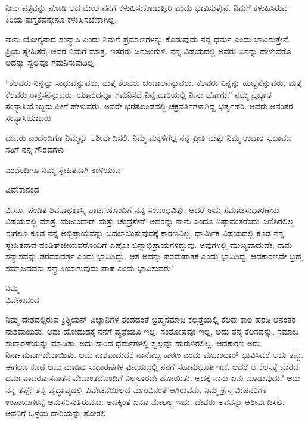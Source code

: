 ನೀವು ಪತ್ರವನ್ನು ನೋಡಿ ಆದ ಮೇಲೆ ನನಗೆ ಕಳುಹಿಸುಕೊಡುತ್ತೀರಿ ಎಂದು ಭಾವಿಸುತ್ತೇನೆ. ನಿಮಗೆ ಕಳುಹಿಸಿರುವ ಕಿರಿಯ ಪುಸ್ತಕವನ್ನೇನೂ ಕಳುಹಿಸಬೇಕಾಗಿಲ್ಲ.

ನಾನು ಯೋಗ್ಯನಾದ ಸಂನ್ಯಾಸಿ ಎಂದು ನಿಮಗೆ ಪ್ರಮಾಣಗಳನ್ನು ಕೊಡುವುದು ನನ್ನ ಧರ್ಮ ಎಂದು ಭಾವಿಸುತ್ತೇನೆ. ಪ್ರಿಯ ಸ್ನೇಹಿತರೆ, ಆದರೆ ನಿಮಗೆ ಮಾತ್ರ. ಇತರರು ಜನಜಂಗುಳಿ. ನನ್ನ ವಿಷಯದಲ್ಲಿ ಅವರು ಏನನ್ನು ಹೇಳುವರೊ ಅದನ್ನು ಸ್ವಲ್ಪವೂ ಗಮನಿಸುವುದಿಲ್ಲ.

“ಕೆಲವರು ನಿನ್ನನ್ನು ಸಾಧುವೆನ್ನುವರು, ಮತ್ತೆ ಕೆಲವರು ಚಂಡಾಲನೆನ್ನುವರು. ಕೆಲವರು ನಿನ್ನನ್ನು ಹುಚ್ಚನೆನ್ನುವರು, ಮತ್ತೆ ಕೆಲವರು ರಾಕ್ಷಸನೆನ್ನುವರು. ಯಾವುದನ್ನೂ ಗಮನಿಸದೆ ನಿನ್ನ ದಾರಿಯಲ್ಲಿ ನೀನು ಹೋಗು.” ನಮ್ಮ ಪ್ರಖ್ಯಾತ ಸಂನ್ಯಾಸಿಯೊಬ್ಬರು ಹೀಗೆ ಹೇಳುವರು. ಅವರೇ ಭರತಖಂಡದಲ್ಲಿ ಚಕ್ರವರ್ತಿಗಳಾಗಿದ್ದ ಭರ್ತೃಹರಿ. ಅವರು ಅನಂತರ ಸಂನ್ಯಾಸಿಯಾದರು.

ದೇವರು ಎಂದೆಂದಿಗೂ ನಿಮ್ಮನ್ನು ಆಶೀರ್ವದಿಸಲಿ. ನಿಮ್ಮ ಮಕ್ಕಳಿಗೆಲ್ಲ ನನ್ನ ಪ್ರೀತಿ ಮತ್ತು ನಿಮ್ಮ ಉದಾರ ಸ್ವಭಾವದ ಸತಿಗೆ ನನ್ನ ಗೌರವಗಳು

ಎಂದೆಂದಿಗೂ ನಿಮ್ಮ ಸ್ನೇಹಿತನಾಗಿ ಉಳಿಯುವ

\begin{flushright}
ವಿವೇಕಾನಂದ
\end{flushright}

ವಿ.ಸೂ. \enginline{-}ಪಂಡಿತ ಶಿವನಾಥಶಾಸ್ತ್ರಿ ಪಾರ್ಟಿಯೊಂದಿಗೆ ನನ್ನ ಸಂಬಂಧವಿತ್ತು. ಆದರೆ ಅದು ಸಮಾಜಸುಧಾರಣೆಯ ವಿಷಯದಲ್ಲಿ ಮಾತ್ರ. ಮಜುಂದಾರ್‌ ಮತ್ತು ಚಂದ್ರಸೇನ್ ಅವರನ್ನು ನಾನು ಎಂದೂ ನಿಷ್ಠಾವಂತರೆಂದು ಎಣಿಸಿರಲಿಲ್ಲ. ಈಗಲೂ ಕೂಡ ನನ್ನ ಅಭಿಪ್ರಾಯವನ್ನು ಬದಲಾಯಿಸುವುದಕ್ಕೆ ಕಾರಣವಿಲ್ಲ. ಧಾರ್ಮಿಕ ವಿಷಯದಲ್ಲಿ ಕೂಡ ನನ್ನ ಸ್ನೇಹಿತನಾದ ಪಂಡಿತ್‌ಜೀಯವರೊಂದಿಗೆ ಎಷ್ಟೋ ಭಿನ್ನಾಭಿಪ್ರಾಯಗಳಿದ್ದುವು. ಅವುಗಳಲ್ಲಿ ಮುಖ್ಯವಾದುದೇ, ನಾನು ಸನ್ಯಾಸವನ್ನು ಪರಮಾದರ್ಶ ಎಂದು ಭಾವಿಸಿದ್ದು. ಆತ ಅದನ್ನು ಪರಮಪಾತಕ ಎಂದು ಭಾವಿಸಿದ್ದ. ಆದಕಾರಣವೇ ಬ್ರಹ್ಮ ಸಮಾಜದವರು ಸನ್ಯಾಸಿಯಾಗುವುದು ಪಾಪ ಎಂದು ಭಾವಿಸುವರು!

\vspace{-0.3cm}

{\flushright
ನಿಮ್ಮ\\ವಿವೇಕಾನಂದ\par}

\vspace{0.2cm}

ನಿಮ್ಮ ದೇಶದಲ್ಲಿರುವ ಕ್ರಿಶ್ಚಿಯನ್ ವಿಜ್ಞಾನಿಗಳ ತಂಡದಂತೆ ಬ್ರಹ್ಮಸಮಾಜ ಕಲ್ಕತ್ತೆಯಲ್ಲಿ ಕೆಲವು ಕಾಲ ಹರಡಿ ಅನಂತರ ನಾಶವಾಯಿತು. ಅದು ಹೋದುದಕ್ಕೆ ನನಗೆ ವ್ಯಥೆಯೂ ಇಲ್ಲ, ಸಂತೋಷವೂ ಇಲ್ಲ. ಅದು ತನ್ನ ಕೆಲಸವನ್ನು, ಸಮಾಜ ಸುಧಾರಣೆಯನ್ನು ಮಾಡಿತು. ಅದು ಸಾರಿದ ಧರ್ಮಗಳಲ್ಲಿ ಸ್ವಲ್ಪವೂ ಹುರುಳಿರಲಿಲ್ಲ. ಆದಕಾರಣ ಅದು ನಿರ್ನಾಮವಾಗಬೇಕಾಯಿತು. ಅದು ನಾಶವಾದುದಕ್ಕೆ ನಾನೊಬ್ಬ ಕಾರಣ ಎಂದು ಮಜುಂದಾರ್ ಭಾವಿಸಿದರೆ ಅದು ತಪ್ಪು. ಈಗಲೂ ಕೂಡ ಅದು ಮಾಡಿದ ಸುಧಾರಣೆಗಳ ವಿಷಯದಲ್ಲಿ ನನಗೆ ಸಹಾನುಭೂತಿ ಇದೆ. ಆದರೆ ಆ ಕೆಲಸಕ್ಕೆ ಬಾರದ ಧರ್ಮವಾದರೂ ಸನಾತನ ವೇದಾಂತದೊಂದಿಗೆ ನಿಲ್ಲಲಾರದೇ ಹೋಯಿತು. ಅದಕ್ಕೆ ನಾನು ಏನು ಮಾಡುವುದು? ಅದು ನನ್ನ ತಪ್ಪೆ? ತನ್ನ ವೃದ್ಧಾಪ್ಯದಲ್ಲಿ ವಿವೇಚನೆಯಿಲ್ಲದ ಮಗುವಿನಂತೆ ಆಗಿರುವನು. ನಿಮ್ಮ ಕ್ರೈಸ್ತ ಮಿಷನರಿಗಳ ಉಪಾಯಗಳನ್ನೆ ಅನುಸರಿಸುತ್ತಿರುವನು. ಅದಕ್ಕಿಂತ ಏನೂ ಮೇಲಲ್ಲ ಇದು. ದೇವರು ಅವನನ್ನು ಆಶೀರ್ವದಿಸಲಿ, ಅವನಿಗೆ ಒಳ್ಳೆಯ ದಾರಿಯನ್ನು ತೋರಲಿ.

